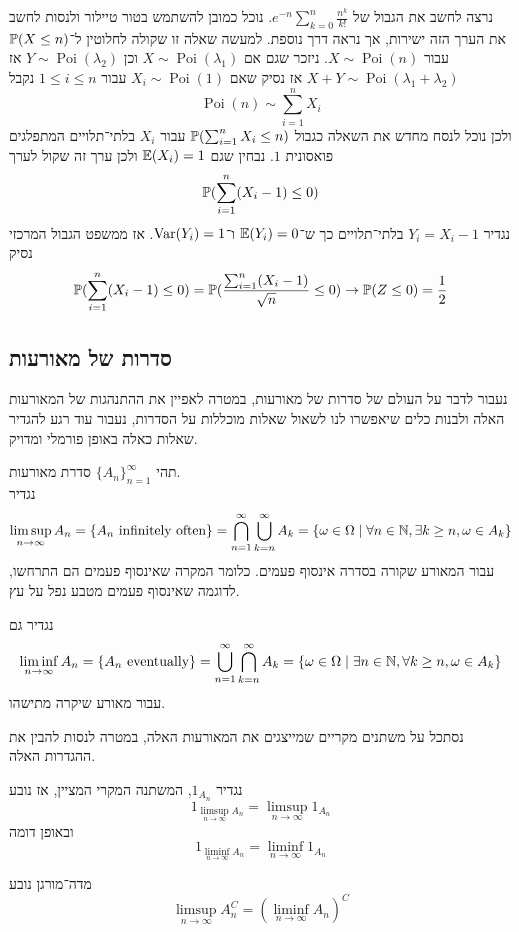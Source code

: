 \begin{example}
	נרצה לחשב את הגבול של $e^{-n} \sum_{k = 0}^{n} \frac{n^k}{k!}$.
	נוכל כמובן להשתמש בטור טיילור ולנסות לחשב את הערך הזה ישירות, אך נראה דרך נוספת.
	למעשה שאלה זו שקולה לחלוטין ל־$\mathbb{P}(X \le n)$ עבור $X \sim \operatorname{Poi}(n)$.
	ניזכר שגם אם $X \sim \operatorname{Poi}(\lambda_1)$ וכן $Y \sim \operatorname{Poi}(\lambda_2)$ אז $X + Y \sim \operatorname{Poi}(\lambda_1 + \lambda_2)$ אז נסיק שאם $X_i \sim \operatorname{Poi}(1)$ עבור $1 \le i \le n$ נקבל
	\[
		\operatorname{Poi}(n) \sim \sum_{i = 1}^{n} X_i
	\]
	ולכן נוכל לנסח מחדש את השאלה כגבול $\mathbb{P}(\sum_{i = 1}^{n} X_i \le n)$ עבור $X_i$ בלתי־תלויים המתפלגים פואסונית $1$.
	נבחין שגם $\mathbb{E}(X_i) = 1$ ולכן ערך זה שקול לערך
	\[
		\mathbb{P}(\sum_{i = 1}^{n} (X_i - 1) \le 0)
	\]
	נגדיר $Y_i = X_i - 1$ בלתי־תלויים כך ש־$\mathbb{E}(Y_i) = 0$ ו־$\operatorname{Var}(Y_i) = 1$.
	אז ממשפט הגבול המרכזי נסיק
	\[
		\mathbb{P}(\sum_{i = 1}^{n} (X_i - 1) \le 0)
		= \mathbb{P}(\frac{\sum_{i = 1}^{n} (X_i - 1)}{\sqrt{n}} \le 0)
		\to \mathbb{P}(Z \le 0)
		= \frac{1}{2}
	\]
\end{example}

\subsection{סדרות של מאורעות}
נעבור לדבר על העולם של סדרות של מאורעות, במטרה לאפיין את ההתנהגות של המאורעות האלה ולבנות כלים שיאפשרו לנו לשאול שאלות מוכללות על הסדרות, נעבור עוד רגע להגדיר שאלות כאלה באופן פורמלי ומדויק.
\begin{definition}
	תהי ${\{A_n\}}_{n = 1}^\infty$ סדרת מאורעות. \\
	נגדיר
	\[
		\limsup_{n \to \infty} A_n = \{ A_n \text{ infinitely often} \} = \bigcap_{n = 1}^\infty \bigcup_{k = n}^\infty A_k
		= \{ \omega \in \Omega \mid \forall n \in \mathbb{N}, \exists k \ge n, \omega \in A_k \}
	\]
	עבור המאורע שקורה בסדרה אינסוף פעמים.
	כלומר המקרה שאינסוף פעמים הם התרחשו, לדוגמה שאינסוף פעמים מטבע נפל על עץ.

	נגדיר גם
	\[
		\liminf_{n \to \infty} A_n
		= \{ A_n \text{ eventually} \}
		= \bigcup_{n = 1}^\infty \bigcap_{k = n}^\infty A_k
		= \{ \omega \in \Omega \mid \exists n \in \mathbb{N}, \forall k \ge n, \omega \in A_k \}
	\]
	עבור מאורע שיקרה מתישהו.
\end{definition}
נסתכל על משתנים מקריים שמייצגים את המאורעות האלה, במטרה לנסות להבין את ההגדרות האלה.
\begin{exercise}
	נגדיר $1_{A_n}$, המשתנה המקרי המציין, אז נובע
	\[
		1_{\limsup_{n \to \infty} A_n}
		= \limsup_{n \to \infty} 1_{A_n}
	\]
	ובאופן דומה
	\[
		1_{\liminf_{n \to \infty} A_n}
		= \liminf_{n \to \infty} 1_{A_n}
	\]
\end{exercise}
\begin{remark}
	מדה־מורגן נובע
	\[
		\limsup_{n \to \infty} A_n^C
		= {(\liminf_{n \to \infty} A_n)}^C
	\]
\end{remark}

